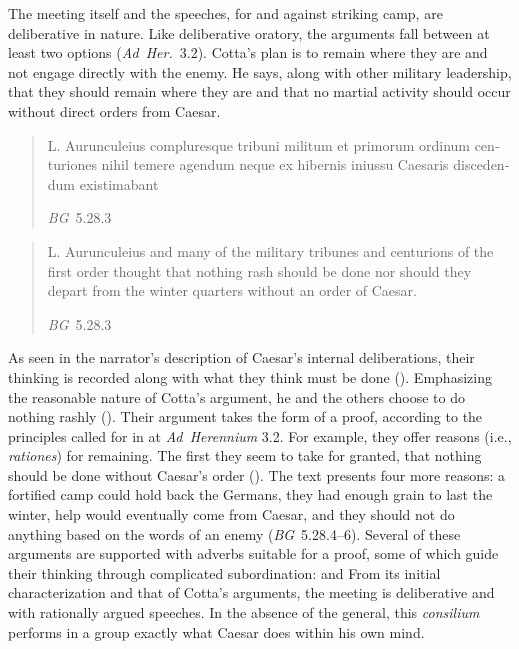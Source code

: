 \documentclass[12pt,letterpaper,oneside,final]{memoir}
\begin{document}
The meeting itself and the speeches, for and against striking camp, are deliberative in nature. Like deliberative oratory, the arguments fall between at least two options (\emph{Ad~Her.}~3.2). Cotta's plan is to remain where they are and not engage directly with the enemy. He says, along with other military leadership, that they should remain where they are and that no martial activity should occur without direct orders from Caesar. \blockquote[\emph{BG}~5.28.3]{\textlatin{L. Aurunculeius compluresque tribuni militum et primorum ordinum centuriones nihil temere agendum neque ex hibernis iniussu Caesaris discedendum existimabant}} \blockquote[\emph{BG}~5.28.3]{L. Aurunculeius and many of the military tribunes and centurions of the first order thought that nothing rash should be done nor should they depart from the winter quarters without an order of Caesar.} As seen in the narrator's description of Caesar's internal deliberations, their thinking is recorded along with what they think must be done (). Emphasizing the reasonable nature of Cotta's argument, he and the others choose to do nothing rashly (). Their argument takes the form of a proof, according to the principles called for in at \emph{Ad~Herennium} 3.2. For example, they offer reasons (i.e., \emph{rationes}) for remaining. The first they seem to take for granted, that nothing should be done without Caesar's order (). The text presents four more reasons: a fortified camp could hold back the Germans, they had enough grain to last the winter, help would eventually come from Caesar, and they should not do anything based on the words of an enemy (\emph{BG}~5.28.4--6). Several of these arguments are supported with adverbs suitable for a proof, some of which guide their thinking through complicated subordination:    and  From its initial characterization and that of Cotta's arguments, the meeting is deliberative and with rationally argued speeches. In the absence of the general, this \emph{consilium} performs in a group exactly what Caesar does within his own mind.
\end{document}
